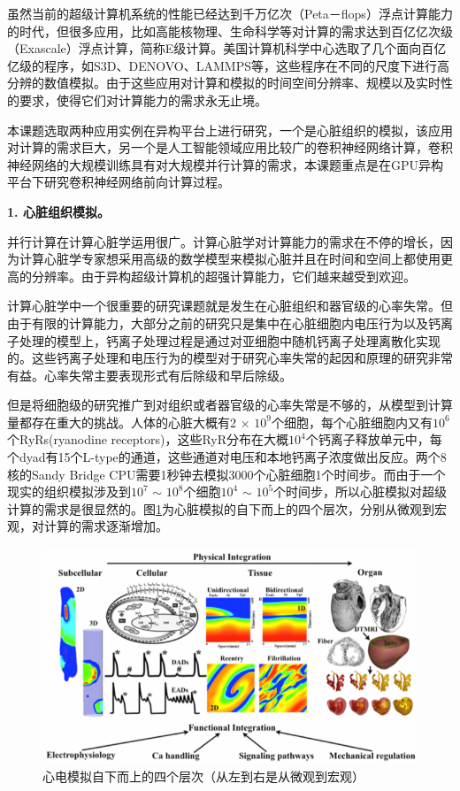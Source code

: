  虽然当前的超级计算机系统的性能已经达到千万亿次（Peta－flops）浮点计算能力的时代，但很多应用，比如高能核物理、生命科学等对计算的需求达到百亿亿次级（Exascale）浮点计算，简称E级计算。美国计算机科学中心选取了几个面向百亿亿级的程序，如S3D、DENOVO、LAMMPS等，这些程序在不同的尺度下进行高分辨的数值模拟。由于这些应用对计算和模拟的时间空间分辨率、规模以及实时性的要求，使得它们对计算能力的需求永无止境。
 
 本课题选取两种应用实例在异构平台上进行研究，一个是心脏组织的模拟，该应用对计算的需求巨大，另一个是人工智能领域应用比较广的卷积神经网络计算，卷积神经网络的大规模训练具有对大规模并行计算的需求，本课题重点是在GPU异构平台下研究卷积神经网络前向计算过程。
 
 \textbf{1.  心脏组织模拟。}
 
并行计算在计算心脏学运用很广。计算心脏学对计算能力的需求在不停的增长，因为计算心脏学专家想采用高级的数学模型来模拟心脏并且在时间和空间上都使用更高的分辨率。由于异构超级计算机的超强计算能力，它们越来越受到欢迎。

计算心脏学中一个很重要的研究课题就是发生在心脏组织和器官级的心率失常。但由于有限的计算能力，大部分之前的研究只是集中在心脏细胞内电压行为以及钙离子处理的模型上，钙离子处理过程是通过对亚细胞中随机钙离子处理离散化实现的。这些钙离子处理和电压行为的模型对于研究心率失常的起因和原理的研究非常有益。心率失常主要表现形式有后除级和早后除级。

但是将细胞级的研究推广到对组织或者器官级的心率失常是不够的，从模型到计算量都存在重大的挑战。人体的心脏大概有2 $\times$ $10^9$个细胞，每个心脏细胞内又有$10^6$个RyRs(ryanodine receptors)，这些RyR分布在大概$10^4$个钙离子释放单元中，每个dyad有15个L-type的通道，这些通道对电压和本地钙离子浓度做出反应。两个8核的Sandy Bridge CPU需要1秒钟去模拟3000个心脏细胞1个时间步。而由于一个现实的组织模拟涉及到$10^7$ $\sim$ $10^8$个细胞$10^4$ $\sim$ $10^5$个时间步，所以心脏模拟对超级计算的需求是很显然的。图\ref{fig:cardiac_level}为心脏模拟的自下而上的四个层次，分别从微观到宏观，对计算的需求逐渐增加。
\begin{figure}[ht!]
\centering
\includegraphics[width=0.9\linewidth]{figs/cardiac_level}
\caption{心电模拟自下而上的四个层次（从左到右是从微观到宏观）}
\label{fig:cardiac_level}
\end{figure}

